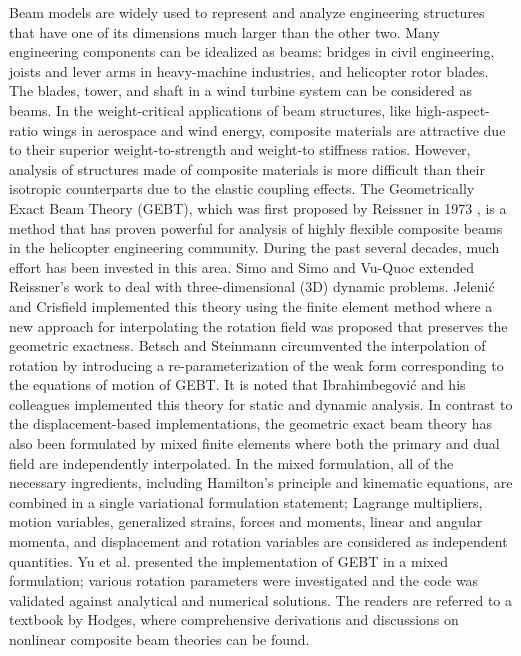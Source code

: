 Beam models are widely used to represent and analyze engineering structures
that have one of its dimensions much larger than the other two. Many
engineering components can be idealized as beams: bridges in civil
engineering, joists and lever arms in heavy-machine industries, and
helicopter rotor blades. The blades, tower, and shaft in a wind turbine
system can be considered as beams. In the weight-critical applications of
beam structures, like high-aspect-ratio wings in aerospace and wind energy,
composite materials are attractive due to their superior weight-to-strength
and weight-to stiffness ratios.  However, analysis of structures made of
composite materials is more difficult than their isotropic counterparts due
to the elastic coupling effects. The Geometrically Exact Beam Theory (GEBT), which
was first proposed by Reissner in 1973 \cite{Ressiner1973}, is a method that
has proven powerful for analysis of highly flexible composite beams in the
helicopter engineering community. During the past several decades, much
effort has been invested in this area. Simo\cite{Simo1985} and Simo and
Vu-Quoc\cite{Simo1986} extended Reissner's work to deal with
three-dimensional (3D) dynamic problems. Jeleni\'c and
Crisfield\cite{Crisfield1999} implemented this theory using the finite
element method where a new approach for interpolating the rotation field was
proposed that preserves the geometric exactness. Betsch and
Steinmann\cite{Betsch2002} circumvented the interpolation of rotation by
introducing a re-parameterization of the weak form corresponding to the
equations of motion of GEBT. It is noted that Ibrahimbegovi\'c and his
colleagues implemented this theory for static\cite{Ibrahim1995} and
dynamic\cite{Ibrahim1998} analysis. In contrast to the displacement-based
implementations, the geometric exact beam theory has also been formulated by
mixed finite elements where both the primary and dual field are
independently interpolated\cite{CookFEM}. In the mixed formulation, all of
the necessary ingredients, including Hamilton's principle and kinematic
equations, are combined in a single variational formulation statement;
Lagrange multipliers, motion variables, generalized strains, forces
and moments, linear and angular momenta, and displacement and rotation
variables are considered as independent quantities. Yu et al.\cite{YuGEBT,
Wang:GEBT2013} presented the implementation of GEBT in a mixed formulation;
various rotation parameters were investigated and the code was validated
against analytical and numerical solutions. The readers are referred to a
textbook by Hodges\cite{HodgesBeamBook}, where comprehensive derivations
and discussions on nonlinear composite beam theories can be found.

